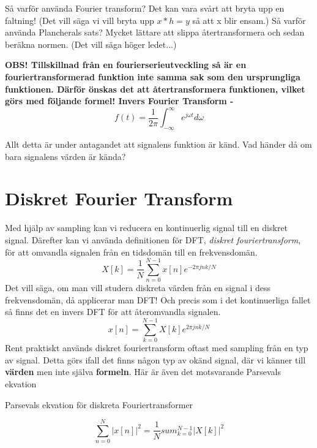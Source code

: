 \documentclass{article}
\begin{document}
Så varför använda Fourier transform? Det kan vara svårt att bryta upp en faltning! (Det vill säga vi vill bryta upp $x*h=y$ så att x blir ensam.)
Så varför använda Plancherals sats? Mycket lättare att slippa återtransformera och sedan beräkna normen. (Det vill säga höger ledet...)

\bf{OBS!} Tillskillnad från en fourierserieutveckling så är en fouriertransformerad funktion \bf{inte} samma sak som den ursprungliga funktionen. Därför önskas det att återtransformera funktionen, vilket görs med följande formel! \newline
Invers Fourier Transform -
$$f(t) = \frac{1}{2 \pi} \int_{-\infty}^{\infty}  e^{j \omega t} d\omega $$

Allt detta är under antagandet att signalens funktion är känd. Vad händer då om bara signalens värden är kända?

\section{Diskret Fourier Transform}
Med hjälp av sampling kan vi reducera en kontinuerlig signal till en diskret signal. Därefter kan vi använda definitionen för DFT, \emph{diskret fouriertransform}, för att omvandla signalen från en tidsdomän till en frekvensdomän.
$$X[k] = \frac{1}{N} \sum_{n=0}^{N-1} x[n] e^{-2 \pi j n k/N}$$
Det vill säga, om man vill studera diskreta värden från en signal i dess frekvensdomän, då applicerar man DFT! Och precis som i det kontinuerliga fallet så finns det en invers DFT för att återomvandla signalen.
$$x[n] = \sum_{k=0}^{N-1} X[k] e^{2 \pi j n k/N} $$ %
Rent praktiskt används diskret fouriertransform oftast med sampling från en typ av signal. Detta görs ifall det finns någon typ av okänd signal, där vi känner till \textbf{värden} men inte själva \textbf{formeln}. %
Här är även det motsvarande Parsevals ekvation

Parsevals ekvation för diskreta Fouriertransformer

$$\sum_{n=0}^{N} |x[n]|^2 = \frac{1}{N} sum_{k=0}^{N-1} |X[k]|^2 $$
\end{document}
